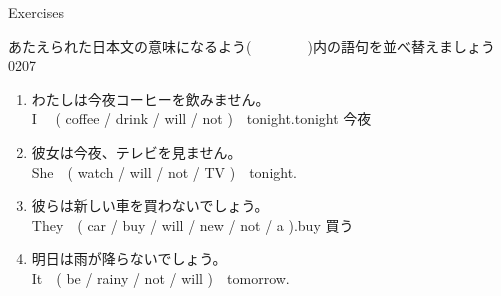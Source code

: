 \documentclass[aspectratio=169,xcolor={dvipsnames,table}]{beamer}
\newcommand{\myaudio}[1]{\href{#1}{\faVolumeUp}}
\begin{document}
\begin{frame}[plain]{Exercises}

{\small あたえられた日本文の意味になるよう(~~~~~~~~)内の語句を並べ替えましょう}%
\mbox{}\hfill{\tiny 0207}\,{\scriptsize \myaudio{./audio/012_will_05.mp3}}

\begin{enumerate}
 \item わたしは今夜コーヒーを飲みません。\\
 I ~~( coffee / drink / will / not )~~tonight.\hfill{\scriptsize tonight  今夜}\\
 \item 彼女は今夜、テレビを見ません。\\
She~~( watch / will / not / TV )~~tonight.\\
 \item 彼らは新しい車を買わないでしょう。\\
 They~~( car / buy / will / new / not / a ).\hfill{\scriptsize buy  買う}\\
 \item 明日は雨が降らないでしょう。\\
It~~( be / rainy / not / will )~~tomorrow.\\
\end{enumerate}

\end{frame}
\end{document}

